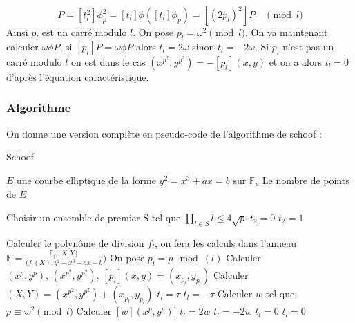 \documentclass[12pt]{article}
\begin{document}
\begin{equation}
[t_l^2 p_l]P = [t_l^2] \phi_p^2 = [t_l] \phi ([t_l] \phi_p) = [(2p_l)^2]P \quad \pmod{l}
\end{equation}
Ainsi $p_l$ est un carré modulo $l$. On pose $p_l = \omega^2 \pmod{l}$. On va maintenant calculer $\omega \phi P$, si $[p_l]P = \omega \phi P$ alors $t_l = 2\omega$ sinon $t_l = -2\omega$.
\newline
\medskip
Si $p_l$ n'est pas un carré modulo $l$ on est dans le cas $(x^{p^2}, y^{p^2}) = - [p_l](x,y)$ et on a alors $t_l = 0$ d'après l'équation caractéristique. 

\newpage
\subsubsection{Algorithme}
On donne une version complète en pseudo-code de l'algorithme de schoof : 

\begin{algorithm}
\caption{Schoof}
\begin{algorithmic}
\REQUIRE $E$ une courbe elliptique de la forme $y^2 = x^3 + ax = b$ sur $\mathbb{F}_p$
\ENSURE Le nombre de points de $E$

\STATE Choisir un ensemble de premier S tel que $\prod_{l \in S}l \leq 4\sqrt{p}$
\STATE $t_2 = 0$
\ELSE
\STATE $t_2 = 1$
\ENDIF

\STATE Calculer le polynôme de division $f_l$, on fera les calculs dans l'anneau $\mathbb{F}= \frac{\mathbb{F_p}[X,Y]}{(f_l(X), y^2 -x^3 - ax - b})$
\STATE On pose $p_l = p \mod(l)$
\STATE Calculer $(x^p, y^p), \, (x^{p^2}, y^{p^2}), \, [p_l](x, y) = (x_{p_l}, y_{p_l})$
\STATE Calculer $(X, Y) = (x^{p^2}, y^{p^2}) + (x_{p_l}, y_{p_l})$
\STATE $t_l = \tau$
\ELSE 
\STATE $t_l = - \tau$
\ENDIF
\ENDIF
\ENDFOR
\ELSE
{}
\STATE Calculer $w$ tel que $p \equiv w^2 \pmod l$ 
\STATE Calculer $[w](x^p,y^p)]$
\IF{$[w](x^p,y^p)] = (x^{p^2}, y^{p^2})$}
\STATE $t_l = 2w$
\ENDIF
\IF{$[w](x^p,y^p)] = (x^{p^2}, -y^{p^2})$}
\STATE $t_l = -2w$
\ELSE
\STATE $t_l =0$
\ENDIF
\ELSE
\STATE $t_l = 0$

\ENDIF
\ENDIF
\ENDFOR
\end{algorithmic}
\end{algorithm}
\newpage
\end{document}
